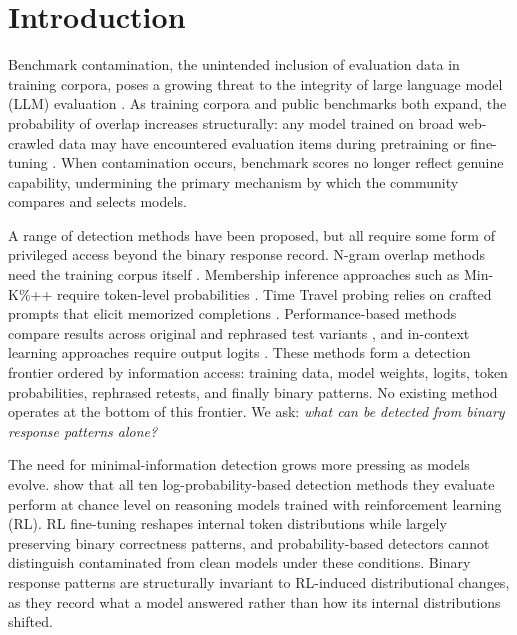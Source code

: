 \section{Introduction}\label{sec:introduction}

Benchmark contamination, the unintended inclusion of evaluation data in training corpora, poses a growing threat to the integrity of large language model (LLM) evaluation \citep{dodge2021, magar2022, sainz2023}.
As training corpora and public benchmarks both expand, the probability of overlap increases structurally: any model trained on broad web-crawled data may have encountered evaluation items during pretraining or fine-tuning \citep{jacovi2023, chang2024survey}.
When contamination occurs, benchmark scores no longer reflect genuine capability, undermining the primary mechanism by which the community compares and selects models.

A range of detection methods have been proposed, but all require some form of privileged access beyond the binary response record.
N-gram overlap methods need the training corpus itself \citep{dodge2021, magar2022}.
Membership inference approaches such as Min-K\%++ require token-level probabilities \citep{minkprob2024, deng2024}.
Time Travel probing relies on crafted prompts that elicit memorized completions \citep{golchin2024, oren2024}.
Performance-based methods compare results across original and rephrased test variants \citep{constat2024}, and in-context learning approaches require output logits \citep{codec2026}.
These methods form a detection frontier ordered by information access: training data, model weights, logits, token probabilities, rephrased retests, and finally binary patterns.
No existing method operates at the bottom of this frontier.
We ask: \emph{what can be detected from binary response patterns alone?}

The need for minimal-information detection grows more pressing as models evolve.
\citet{wang2025fragility} show that all ten log-probability-based detection methods they evaluate perform at chance level on reasoning models trained with reinforcement learning (RL).
RL fine-tuning reshapes internal token distributions while largely preserving binary correctness patterns, and probability-based detectors cannot distinguish contaminated from clean models under these conditions.
Binary response patterns are structurally invariant to RL-induced distributional changes, as they record what a model answered rather than how its internal distributions shifted.

